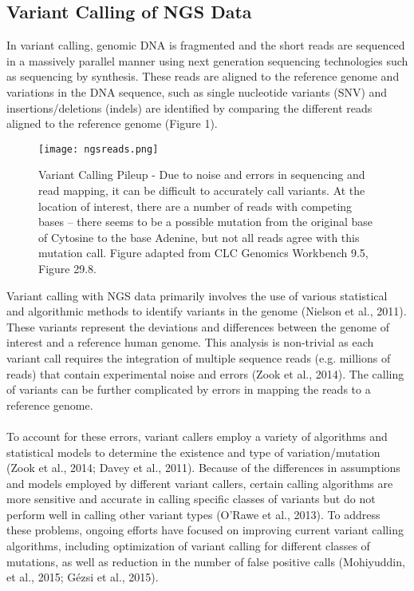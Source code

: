 \documentclass{article}
\begin{document}
\subsection{Variant Calling of NGS Data}
In variant calling, genomic DNA is fragmented and the short reads are sequenced in a massively parallel manner using next generation sequencing technologies such as sequencing by synthesis. These reads  are aligned to the reference genome and variations in the DNA sequence, such as single nucleotide variants (SNV) and insertions/deletions (indels) are identified by comparing the different reads aligned to the reference genome (Figure 1).
\begin{figure}[H]
\texttt{[image: ngsreads.png]}
\centering
\caption{Variant Calling Pileup - Due to noise and errors in sequencing and read mapping, it can be difficult to accurately call variants. At the location of interest, there are a number of reads with competing bases -- there seems to be a possible mutation from the original base of Cytosine to the base Adenine, but not all reads agree with this mutation call. Figure adapted from CLC Genomics Workbench 9.5, Figure 29.8.}
\end{figure}
Variant calling with NGS data primarily involves the use of various statistical and algorithmic methods to identify variants in the genome (Nielson et al., 2011). These variants represent the deviations and differences between the genome of interest and a reference human genome. This analysis is non-trivial as each variant call requires the integration of multiple sequence reads (e.g. millions of reads) that contain experimental noise and errors (Zook et al., 2014). The calling of variants can be further complicated by errors in mapping the reads to a reference genome. \\\\ To account for these errors, variant callers employ a variety of algorithms and statistical models to determine the existence and type of variation/mutation (Zook et al., 2014; Davey et al., 2011). Because of the differences in assumptions and models employed by different variant callers, certain calling algorithms are more sensitive and accurate in calling specific classes of variants but do not perform well in calling other variant types (O'Rawe et al., 2013). To address these problems, ongoing efforts have focused on improving current variant calling algorithms, including optimization of variant calling for different classes of mutations, as well as reduction in the number of false positive calls (Mohiyuddin, et al., 2015; Gézsi et al., 2015). 
\end{document}

